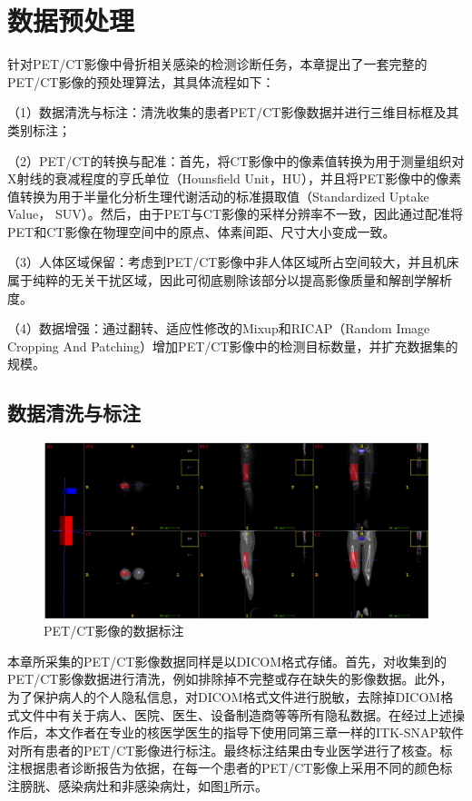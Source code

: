 \section{数据预处理}

针对PET/CT影像中骨折相关感染的检测诊断任务，本章提出了一套完整的PET/CT影像的预处理算法，其具体流程如下：

（1）数据清洗与标注：清洗收集的患者PET/CT影像数据并进行三维目标框及其类别标注；

（2）PET/CT的转换与配准：首先，将CT影像中的像素值转换为用于测量组织对X射线的衰减程度的亨氏单位（Hounsfield Unit，HU），并且将PET影像中的像素值转换为用于半量化分析生理代谢活动的标准摄取值（Standardized Uptake Value， SUV）。然后，由于PET与CT影像的采样分辨率不一致，因此通过配准将PET和CT影像在物理空间中的原点、体素间距、尺寸大小变成一致。

（3）人体区域保留：考虑到PET/CT影像中非人体区域所占空间较大，并且机床属于纯粹的无关干扰区域，因此可彻底剔除该部分以提高影像质量和解剖学解析度。

（4）数据增强：通过翻转、适应性修改的Mixup和RICAP（Random Image Cropping And Patching）增加PET/CT影像中的检测目标数量，并扩充数据集的规模。

\subsection{数据清洗与标注}

\begin{figure}[htbp]
  \centering
  \includegraphics[width=\textwidth]{figures/chap04_label.jpg}
  \caption{PET/CT影像的数据标注}
  \label{fig:chap04_label}
\end{figure}

本章所采集的PET/CT影像数据同样是以DICOM格式存储。首先，对收集到的PET/CT影像数据进行清洗，例如排除掉不完整或存在缺失的影像数据。此外，为了保护病人的个人隐私信息，对DICOM格式文件进行脱敏，去除掉DICOM格式文件中有关于病人、医院、医生、设备制造商等等所有隐私数据。在经过上述操作后，本文作者在专业的核医学医生的指导下使用同第三章一样的ITK-SNAP软件对所有患者的PET/CT影像进行标注。最终标注结果由专业医学进行了核查。标注根据患者诊断报告为依据，在每一个患者的PET/CT影像上采用不同的颜色标注膀胱、感染病灶和非感染病灶，如图\ref{fig:chap04_label}所示。

